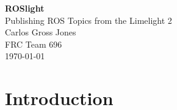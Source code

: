 \documentclass{article}
\begin{document}
	\begin{titlepage}
	\begin{center}
		
	
	\vspace*{1in}
	{\Huge \textbf{ROSlight}}\\
	\vspace{0.25in}
	{\LARGE Publishing ROS Topics from the Limelight 2}\\
	\vspace{0.5in}
	{\Large Carlos Gross Jones}\\
	\vspace{0.1in}
	{\Large FRC Team 696}\\
	\vspace{0.1in}
	{\Large \today}\\
\end{center}
	
\end{titlepage}

\begin{abstract}
	In this whitepaper, careful examination of the Limelight software is undertaken. After gaining root access to the OS, the core ROS code is compiled and installed on the Limelight. Finally, ROS packages are developed to publish the Limelight output data (target orientation, etc.) as ROS topics. 
\end{abstract}

\section{Introduction}
\end{document}

